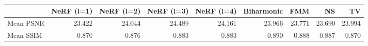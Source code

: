 \begin{tabular}{lrrrrrrrr}
\toprule
 & NeRF (l=1) & NeRF (l=2) & NeRF (l=3) & NeRF (l=4) & Biharmonic & FMM & NS & TV \\
\midrule
Mean PSNR & 23.422 & 24.044 & 24.489 & 24.161 & 23.966 & 23.771 & 23.690 & 23.994 \\
Mean SSIM & 0.870 & 0.876 & 0.883 & 0.883 & 0.890 & 0.888 & 0.887 & 0.870 \\
\bottomrule
\end{tabular}
